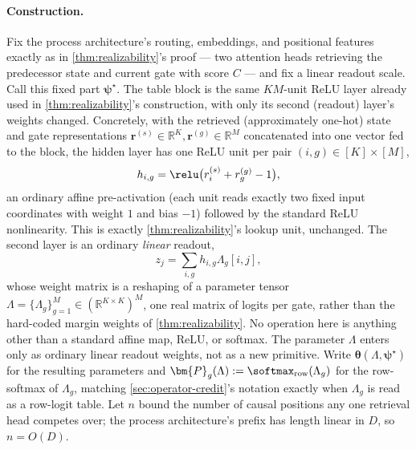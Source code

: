 \paragraph{Construction.} Fix the process architecture's routing,
embeddings, and positional features exactly as in \cref{thm:realizability}'s
proof --- two attention heads retrieving the predecessor state and current
gate with score $C$ --- and fix a linear readout scale. Call this fixed
part $\bm{\psi}^\star$. The table block is the same $KM$-unit ReLU layer
already used in \cref{thm:realizability}'s construction, with only its
second (readout) layer's weights changed. Concretely, with the retrieved
(approximately one-hot) state and gate representations
$\bm{r}^{(s)}\in\mathbb R^K,\bm{r}^{(g)}\in\mathbb R^M$ concatenated into
one vector fed to the block, the hidden layer has one ReLU unit per pair
$(i,g)\in[K]\times[M]$,
\begin{equation}
 h_{i,g}=\relu\bigl(r^{(s)}_i+r^{(g)}_g-1\bigr),
 \label{eq:table-hidden}
\end{equation}
an ordinary affine pre-activation (each unit reads exactly two fixed
input coordinates with weight $1$ and bias $-1$) followed by the standard
ReLU nonlinearity. This is exactly \cref{thm:realizability}'s lookup unit,
unchanged. The second layer is an ordinary \emph{linear} readout,
\begin{equation}
 z_j=\sum_{i,g}h_{i,g}\Lambda_g[i,j],
 \label{eq:table-readout}
\end{equation}
whose weight matrix is a reshaping of a parameter tensor
$\Lambda=\{\Lambda_g\}_{g=1}^M\in(\mathbb R^{K\times K})^M$, one real matrix of logits
per gate, rather than the hard-coded margin weights of
\cref{thm:realizability}. No operation here is anything other than a
standard affine map, ReLU, or softmax. The parameter $\Lambda$ enters only as ordinary linear
readout weights, not as a new primitive. Write $\bm{\theta}(\Lambda,\bm{\psi}^\star)$
for the resulting parameters and $\bm{P}_g(\Lambda):=\softmax_{\rm row}(\Lambda_g)$ for
the row-softmax of $\Lambda_g$, matching \cref{sec:operator-credit}'s notation
exactly when $\Lambda_g$ is read as a row-logit table. Let $n$ bound the number
of causal positions any one retrieval head competes over; the process
architecture's prefix has length linear in $D$, so $n=O(D)$.

